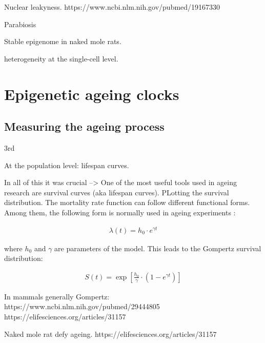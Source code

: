 Nuclear leakyness. 
https://www.ncbi.nlm.nih.gov/pubmed/19167330

Parabiosis

Stable epigenome in naked mole rats.

heterogeneity at the single-cell level.

\section{Epigenetic ageing clocks}

\subsection{Measuring the ageing process}

3rd

At the population level: lifespan curves. 

In all of this it was crucial --> One of the most useful tools used in ageing research are survival curves (aka lifespan curves). PLotting the survival distribution. The mortality rate function can follow different functional forms. Among them, the following form is normally used in ageing experiments \cite{Witten1986}:

\begin{align}
\lambda(t) = h_0 \cdot e^{\gamma t}
\end{align}

where $h_0$ and $\gamma$ are parameters of the model. This leads to the Gompertz survival distribution:

\begin{align}
S(t) = \exp \left[ \frac{h_0}{\gamma} \cdot (1-e^{\gamma t}) \right]
\end{align}



In mammals generally Gompertz:
https://www.ncbi.nlm.nih.gov/pubmed/29444805
https://elifesciences.org/articles/31157 

Naked mole rat defy ageing. https://elifesciences.org/articles/31157



